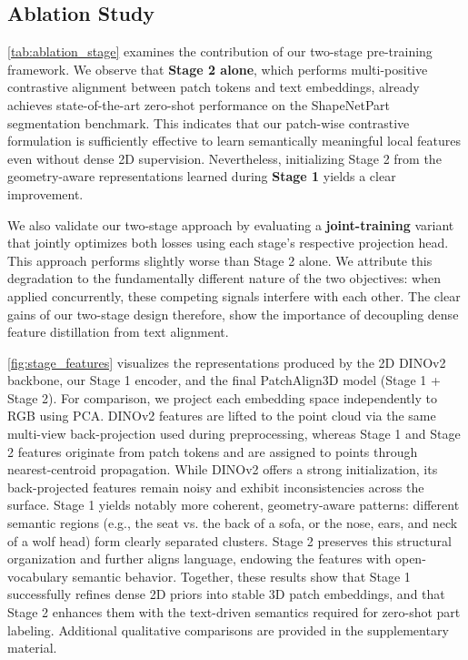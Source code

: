 \subsection{Ablation Study}

\cref{tab:ablation_stage} examines the contribution of our two-stage pre-training framework. We observe that \textbf{Stage 2 alone}, which performs multi-positive contrastive alignment between patch tokens and text embeddings, already achieves state-of-the-art zero-shot performance on the ShapeNetPart segmentation benchmark. This indicates that our patch-wise contrastive formulation is sufficiently effective to learn semantically meaningful local features even without dense 2D supervision.
Nevertheless, initializing Stage 2 from the geometry-aware representations learned during \textbf{Stage 1} yields a clear improvement.

We also validate our two-stage approach by evaluating a \textbf{joint-training} variant that jointly optimizes both losses using each stage's respective projection head. This approach performs slightly worse than Stage 2 alone. We attribute this degradation to the fundamentally different nature of the two objectives: when applied concurrently, these competing signals interfere with each other. The clear gains of our two-stage design therefore, show the importance of decoupling dense feature distillation from text alignment.

\cref{fig:stage_features} visualizes the representations produced by the 2D DINOv2 backbone, our Stage 1 encoder, and the final PatchAlign3D model (Stage 1 + Stage 2). For comparison, we project each embedding space independently to RGB using PCA. DINOv2 features are lifted to the point cloud via the same multi-view back-projection used during preprocessing, whereas Stage 1 and Stage 2 features originate from patch tokens and are assigned to points through nearest-centroid propagation. While DINOv2 offers a strong initialization, its back-projected features remain noisy and exhibit inconsistencies across the surface. Stage 1 yields notably more coherent, geometry-aware patterns: different semantic regions (e.g., the seat vs. the back of a sofa, or the nose, ears, and neck of a wolf head) form clearly separated clusters. Stage 2 preserves this structural organization and further aligns language, endowing the features with open-vocabulary semantic behavior. Together, these results show that Stage 1 successfully refines dense 2D priors into stable 3D patch embeddings, and that Stage 2 enhances them with the text-driven semantics required for zero-shot part labeling. Additional qualitative comparisons are provided in the supplementary material.






